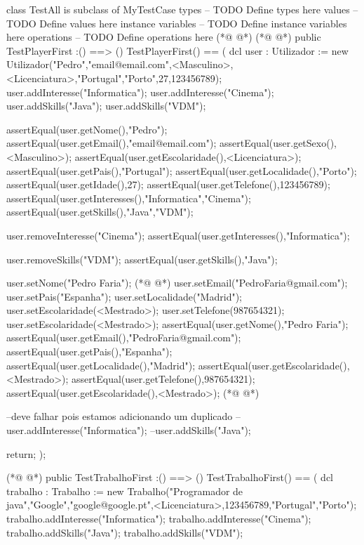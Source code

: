 \begin{vdmpp}[breaklines=true]
class TestAll is subclass of MyTestCase
types
-- TODO Define types here
values
-- TODO Define values here
instance variables
-- TODO Define instance variables here
operations
-- TODO Define operations here
(*@
\label{TestPlayerFirst:10}
@*)
(*@
\label{TestPlayerFirst:10}
@*)
public TestPlayerFirst :() ==> ()
TestPlayerFirst() ==
(
 dcl user : Utilizador := new Utilizador("Pedro","email@email.com",<Masculino>,<Licenciatura>,"Portugal","Porto",27,123456789);
 user.addInteresse("Informatica");
 user.addInteresse("Cinema");
 user.addSkills("Java");
 user.addSkills("VDM");
 
 assertEqual(user.getNome(),"Pedro");
 assertEqual(user.getEmail(),"email@email.com");
 assertEqual(user.getSexo(),<Masculino>);
 assertEqual(user.getEscolaridade(),<Licenciatura>);
 assertEqual(user.getPais(),"Portugal");
 assertEqual(user.getLocalidade(),"Porto");
 assertEqual(user.getIdade(),27);
 assertEqual(user.getTelefone(),123456789);
 assertEqual(user.getInteresses(),{"Informatica","Cinema"});
 assertEqual(user.getSkills(),{"Java","VDM"});
 
 user.removeInteresse("Cinema");
 assertEqual(user.getInteresses(),{"Informatica"});
 
 user.removeSkills("VDM");
 assertEqual(user.getSkills(),{"Java"});
 
 user.setNome("Pedro Faria");
(*@
\label{main:37}
@*)
 user.setEmail("PedroFaria@gmail.com");
 user.setPais("Espanha");
 user.setLocalidade("Madrid");
 user.setEscolaridade(<Mestrado>);
 user.setTelefone(987654321);
 user.setEscolaridade(<Mestrado>);
 assertEqual(user.getNome(),"Pedro Faria");
 assertEqual(user.getEmail(),"PedroFaria@gmail.com");
 assertEqual(user.getPais(),"Espanha");
 assertEqual(user.getLocalidade(),"Madrid");
 assertEqual(user.getEscolaridade(),<Mestrado>);
 assertEqual(user.getTelefone(),987654321);
 assertEqual(user.getEscolaridade(),<Mestrado>);
(*@
\label{TestTrabalhoFirst:50}
@*)
 
 --deve falhar pois estamos adicionando um duplicado
 --user.addInteresse("Informatica");
 --user.addSkills("Java");
 
 return;
);


(*@
\label{TestTrabalhoFirst:59}
@*)
public TestTrabalhoFirst :() ==> ()
TestTrabalhoFirst() ==
(
 dcl trabalho : Trabalho := new Trabalho("Programador de java","Google","google@google.pt",<Licenciatura>,123456789,"Portugal","Porto");
 trabalho.addInteresse("Informatica");
 trabalho.addInteresse("Cinema");
 trabalho.addSkills("Java");
 trabalho.addSkills("VDM");
 

\end{vdmpp}
